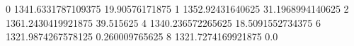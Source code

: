 0 1341.6331787109375 19.90576171875
1 1352.92431640625 31.1968994140625
2 1361.2430419921875 39.515625
4 1340.236572265625 18.5091552734375
6 1321.9874267578125 0.260009765625
8 1321.7274169921875 0.0
